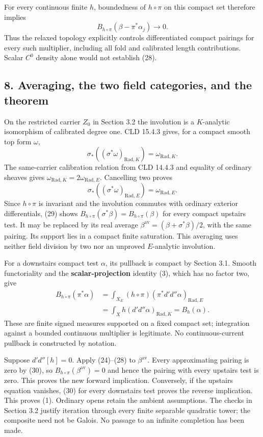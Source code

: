\documentclass[
  11pt,
]{article}
\begin{document}
For every continuous finite \(h\), boundedness of \(h\circ\pi\) on this
compact set therefore implies \[
 B_{h\circ\pi}(\beta-\pi^*\alpha_j)\longrightarrow0.        \tag{28}
\] Thus the relaxed topology explicitly controls differentiated compact
pairings for every such multiplier, including all fold and calibrated
length contributions. Scalar \(C^0\) density alone would not establish
(28).

\subsection{8. Averaging, the two field categories, and the
theorem}\label{averaging-the-two-field-categories-and-the-theorem}

On the restricted carrier \(Z_0\) in Section 3.2 the involution is a
\(K\)-analytic isomorphism of calibrated degree one. CLD 15.4.3 gives,
for a compact smooth top form \(\omega\), \[
 \sigma_*((\sigma^*\omega)_{\mathrm{Rad},K})
                      =\omega_{\mathrm{Rad},K}.
\] The same-carrier calibration relation from CLD 14.4.3 and equality of
ordinary sheaves gives
\(\omega_{\mathrm{Rad},K}=2\omega_{\mathrm{Rad},E}\). Cancelling two
proves \[
 \sigma_*((\sigma^*\omega)_{\mathrm{Rad},E})
                      =\omega_{\mathrm{Rad},E}.             \tag{29}
\] Since \(h\circ\pi\) is invariant and the involution commutes with
ordinary exterior differentials, (29) shows
\(B_{h\circ\pi}(\sigma^*\beta)=B_{h\circ\pi}(\beta)\) for every compact
upstairs test. It may be replaced by its real average
\(\beta^{\mathrm{av}}=(\beta+\sigma^*\beta)/2\), with the same pairing.
Its support lies in a compact finite saturation. This averaging uses
neither field division by two nor an unproved \(E\)-analytic involution.

For a downstairs compact test \(\alpha\), its pullback is compact by
Section 3.1. Smooth functoriality and the \textbf{scalar-projection}
identity (3), which has no factor two, give \[
 \begin{split}
 B_{h\circ\pi}(\pi^*\alpha)
 &=\int_{X_E}(h\circ\pi)(\pi^*d'd''\alpha)_{\mathrm{Rad},E}\\
 &=\int_X h(d'd''\alpha)_{\mathrm{Rad},K}=B_h(\alpha).
 \end{split}                                                \tag{30}
\] These are finite signed measures supported on a fixed compact set;
integration against a bounded continuous multiplier is legitimate. No
continuous-current pullback is constructed by notation.

Suppose \(d'd''[h]=0\). Apply (24)--(28) to \(\beta^{\mathrm{av}}\).
Every approximating pairing is zero by (30), so
\(B_{h\circ\pi}(\beta^{\mathrm{av}})=0\) and hence the pairing with
every upstairs test is zero. This proves the new forward implication.
Conversely, if the upstairs equation vanishes, (30) for every downstairs
test proves the reverse implication. This proves (1). Ordinary opens
retain the ambient assumptions. The checks in Section 3.2 justify
iteration through every finite separable quadratic tower; the composite
need not be Galois. No passage to an infinite completion has been made.
\end{document}
